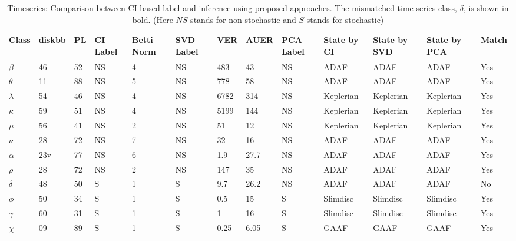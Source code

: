 \documentclass[journal]{IEEEtran}
\begin{document}
	
	
	\begin{table}[t]
		\caption{Timeseries: Comparison between CI-based label and inference using proposed approaches. The mismatched time series class, $\delta$, is shown in bold. (Here $NS$ stands for non-stochastic and $S$ stands for stochastic)}
		\begin{center}
			\begin{tabular}{|p{0.5cm}|p{0.5cm}|p{0.5cm}|p{0.75cm}|p{0.75cm}|p{0.75cm}|p{0.75cm}|p{1cm}|p{0.5cm}|p{1.25cm}|p{1.25cm}|p{1.25cm}|p{0.75cm}|}
				\hline
				Class &  diskbb & PL & CI \newline Label & Betti Norm & SVD \newline Label & VER & AUER & PCA \newline Label  &  State by CI & State by SVD  & State by PCA  &Match \\
				\hline
				$\beta$ & 46 & 52 & NS & 4 & NS & 483 & 43 & NS & ADAF & ADAF & ADAF & Yes\\
			\hline
				$\theta$ & 11 & 88 & NS &  5 & NS & 778 & 58 & NS  &  ADAF & ADAF & ADAF & Yes \\
				\hline
			$\lambda$ & 54& 46 & NS & 4 & NS & 6782 & 314 & NS & Keplerian & Keplerian & Keplerian & Yes \\
			\hline
				$\kappa$ &59 & 51& NS & 4 & NS & 5199 & 144 & NS & Keplerian & Keplerian & Keplerian &Yes \\
			\hline
		$\mu$ & 56 & 41& NS & 2 & NS & 51 & 12 & NS & Keplerian & Keplerian & Keplerian &Yes \\
		\hline
			$\nu$ &28 &72& NS & 7 & NS & 32 & 16 & NS & ADAF & ADAF & ADAF & Yes \\
			\hline
$\alpha$  & 23v& 77 & NS & 6 & NS & 1.9 & 27.7 & NS & ADAF & ADAF & ADAF &Yes \\
\hline
$\rho$ & 28& 72& NS & 2 & NS & 147 & 35 & NS & ADAF & ADAF & ADAF & Yes \\
\hline
$\delta$ &48 & 50& S & 1 & S & 9.7 & 26.2 & NS & ADAF & ADAF & ADAF & No \\
\hline
$\phi$ & 50 &34&S & 1 & S & 0.5 & 15 & S & Slimdisc & Slimdisc & Slimdisc &Yes \\
\hline
$\gamma$ & 60&31 & S & 1 & S & 1 & 16 & S & Slimdisc & Slimdisc & Slimdisc &Yes \\
\hline
$\chi$ & 09& 89 & S & 1 & S & 0.25 & 6.05 & S & GAAF & GAAF & GAAF &Yes \\
\hline
			\end{tabular}
			\label{tab:results_1}
		\end{center}
	\end{table}
\end{document}
